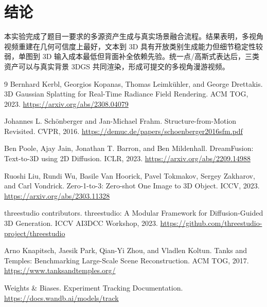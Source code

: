 \documentclass[10pt,twocolumn]{ctexart}
\begin{document}
\section{结论}
本实验完成了题目一要求的多源资产生成与真实场景融合流程。结果表明，多视角视频重建在几何可信度上最好，文本到 3D 具有开放类别生成能力但细节稳定性较弱，单图到 3D 输入成本最低但背面补全依赖先验。统一点/高斯式表达后，三类资产可以与真实背景 3DGS 共同渲染，形成可提交的多视角漫游视频。

\begin{thebibliography}{9}
Bernhard Kerbl, Georgios Kopanas, Thomas Leimkühler, and George Drettakis.
\newblock 3D Gaussian Splatting for Real-Time Radiance Field Rendering.
\newblock ACM TOG, 2023. \url{https://arxiv.org/abs/2308.04079}

Johannes L. Schönberger and Jan-Michael Frahm.
\newblock Structure-from-Motion Revisited.
\newblock CVPR, 2016. \url{https://demuc.de/papers/schoenberger2016sfm.pdf}

Ben Poole, Ajay Jain, Jonathan T. Barron, and Ben Mildenhall.
\newblock DreamFusion: Text-to-3D using 2D Diffusion.
\newblock ICLR, 2023. \url{https://arxiv.org/abs/2209.14988}

Ruoshi Liu, Rundi Wu, Basile Van Hoorick, Pavel Tokmakov, Sergey Zakharov, and Carl Vondrick.
\newblock Zero-1-to-3: Zero-shot One Image to 3D Object.
\newblock ICCV, 2023. \url{https://arxiv.org/abs/2303.11328}

threestudio contributors.
\newblock threestudio: A Modular Framework for Diffusion-Guided 3D Generation.
\newblock ICCV AI3DCC Workshop, 2023. \url{https://github.com/threestudio-project/threestudio}

Arno Knapitsch, Jaesik Park, Qian-Yi Zhou, and Vladlen Koltun.
\newblock Tanks and Temples: Benchmarking Large-Scale Scene Reconstruction.
\newblock ACM TOG, 2017. \url{https://www.tanksandtemples.org/}

Weights \& Biases.
\newblock Experiment Tracking Documentation.
\newblock \url{https://docs.wandb.ai/models/track}
\end{thebibliography}
\end{document}
